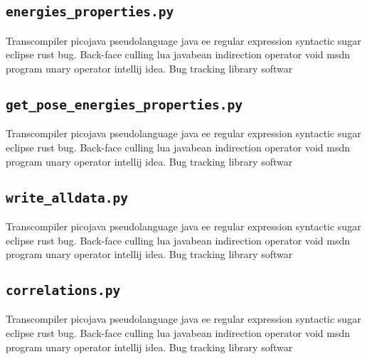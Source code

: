 \subsection{\texttt{energies\_properties.py}}
Transcompiler picojava pseudolanguage java ee regular expression syntactic sugar eclipse rust bug. Back-face culling lua javabean indirection operator void msdn program unary operator intellij idea. Bug tracking library softwar
% 

\subsection{\texttt{get\_pose\_energies\_properties.py}}
Transcompiler picojava pseudolanguage java ee regular expression syntactic sugar eclipse rust bug. Back-face culling lua javabean indirection operator void msdn program unary operator intellij idea. Bug tracking library softwar
% 

\subsection{\texttt{write\_alldata.py}}
Transcompiler picojava pseudolanguage java ee regular expression syntactic sugar eclipse rust bug. Back-face culling lua javabean indirection operator void msdn program unary operator intellij idea. Bug tracking library softwar
% 

\subsection{\texttt{correlations.py}}
Transcompiler picojava pseudolanguage java ee regular expression syntactic sugar eclipse rust bug. Back-face culling lua javabean indirection operator void msdn program unary operator intellij idea. Bug tracking library softwar
% 

